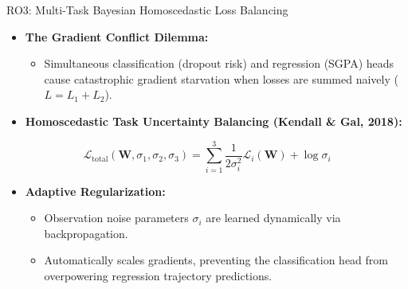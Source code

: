 \documentclass{beamer}
\begin{document}
\begin{frame}{RO3: Multi-Task Bayesian Homoscedastic Loss Balancing}
  \begin{itemize}\setlength{\itemsep}{8pt}
    \item \textbf{The Gradient Conflict Dilemma:}
    \begin{itemize}\setlength{\itemsep}{3pt}
      \item Simultaneous classification (dropout risk) and regression (SGPA) heads cause catastrophic gradient starvation when losses are summed naively ($L = L_1 + L_2$).
    \end{itemize}
    
    \item \textbf{Homoscedastic Task Uncertainty Balancing (Kendall \& Gal, 2018):}
  \end{itemize}
  \vspace{-0.1cm}
  \begin{equation*}
    \mathcal{L}_{\text{total}}(\mathbf{W}, \sigma_1, \sigma_2, \sigma_3) = \sum_{i=1}^{3} \frac{1}{2\sigma_i^2}\mathcal{L}_i(\mathbf{W}) + \log \sigma_i
  \end{equation*}
  \begin{itemize}\setlength{\itemsep}{8pt}
    \item \textbf{Adaptive Regularization:}
    \begin{itemize}\setlength{\itemsep}{3pt}
      \item Observation noise parameters $\sigma_i$ are learned dynamically via backpropagation.
      \item Automatically scales gradients, preventing the classification head from overpowering regression trajectory predictions.
    \end{itemize}
  \end{itemize}
\end{frame}
\end{document}
